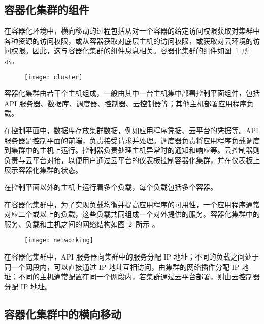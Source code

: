 {\subsection{容器化集群的组件}

在容器化环境中，横向移动的过程包括从对一个容器的给定访问权限获取对集群中各种资源的访问权限，或从容器获取对底层主机的访问权限，或获取对云环境的访问权限。因此，这与容器化集群的组件息息相关。容器化集群的组件如图~\ref{fig:cluster}~所示\citep{k8scomp}。

\begin{figure}[t]
    \centering
    \texttt{[image: cluster]}
    \label{fig:cluster}

\end{figure}

容器化集群由若干个主机组成，一般由其中一台主机集中部署控制平面组件，包括 API 服务器、数据库、调度器、控制器、云控制器等；其他主机部署应用程序负载。

在控制平面中，数据库存放集群数据，例如应用程序凭据、云平台的凭据等。API 服务器是控制平面的前端，负责接受请求并处理。调度器负责将应用程序负载调度到集群中的主机上运行。控制器负责处理主机异常时的通知和响应等。云控制器则负责与云平台对接，以便用户通过云平台的仪表板控制容器化集群，并在仪表板上展示容器化集群的状态。

在控制平面以外的主机上运行着多个负载，每个负载包括多个容器。

在容器化集群中，为了实现负载均衡并提高应用程序的可用性，一个应用程序通常对应二个或以上的负载，这些负载共同组成一个对外提供的服务。容器化集群中的服务、负载和主机之间的网络结构如图~\ref{fig:networking}~所示 \citep{k8snet}。

\begin{figure}[t]
    \centering
    \texttt{[image: networking]}
    \label{fig:networking}

\end{figure}

在容器化集群中，API 服务器向集群中的服务分配 IP 地址；不同的负载之间处于同一个网段内，可以直接通过 IP 地址互相访问，由集群的网络插件分配 IP 地址；不同的主机通常配置在同一个网段内，若集群通过云平台部署，则由云控制器分配 IP 地址。

\subsection{容器化集群中的横向移动}

}
